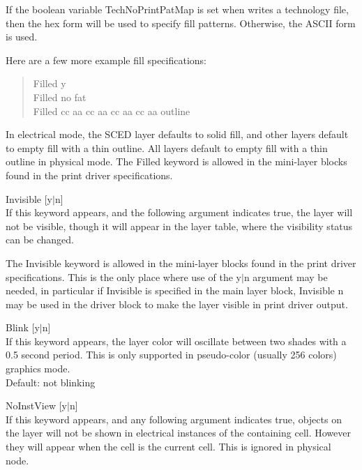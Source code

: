 \begin{description}
If the boolean variable {\et TechNoPrintPatMap} is set when {\Xic}
writes a technology file, then the hex form will be used to specify
fill patterns.  Otherwise, the ASCII form is used.

Here are a few more example fill specifications:\\
\begin{quote}
{\vt Filled y}\\
{\vt Filled no fat}\\
{\vt Filled cc aa cc aa cc aa cc aa outline}
\end{quote}

In electrical mode, the SCED layer defaults to solid fill, and other
layers default to empty fill with a thin outline.  All layers default
to empty fill with a thin outline in physical mode.  The {\vt Filled}
keyword is allowed in the mini-layer blocks found in the print driver
specifications.

\item{\vt Invisible} [{\vt y}$|${\vt n}]\\
If this keyword appears, and the following argument indicates true,
the layer will not be visible, though it will appear in the layer
table, where the visibility status can be changed.

The {\vt Invisible} keyword is allowed in the mini-layer blocks found
in the print driver specifications.  This is the only place where use
of the {\vt y}$|${\vt n} argument may be needed, in particular if {\vt
Invisible} is specified in the main layer block, {\vt Invisible n} may
be used in the driver block to make the layer visible in print driver
output.

\item{\vt Blink} [{\vt y}$|${\vt n}]\\
If this keyword appears, the layer color will oscillate between two
shades with a 0.5 second period.  This is only supported in
pseudo-color (usually 256 colors) graphics mode.\\
Default: not blinking

\item{\vt NoInstView} [{\vt y}$|${\vt n}]\\
If this keyword appears, and any following argument indicates true,
objects on the layer will not be shown in electrical instances of the
containing cell.  However they will appear when the cell is the
current cell.  This is ignored in physical node.


\end{description}
